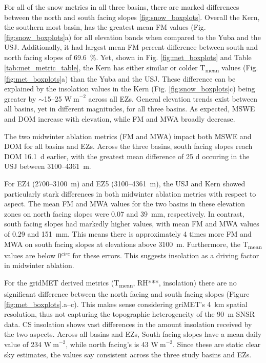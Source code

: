For all of the snow metrics in all three basins, there are marked differences between the north and south facing slopes \ref{fig:snow_boxplots}. Overall the Kern, the southern most basin, has the greatest mean FM values (Fig. \ref{fig:snow_boxplots}a) for all elevation bands when compared to the Yuba and the USJ. Additionally, it had largest mean FM percent difference between south and north facing slopes of 69.6~\%. Yet, shown in Fig. \ref{fig:met_boxplots} and Table \ref{tab:met_metric_table}, the Kern has either similar or colder T\textsubscript{mean} values (Fig. \ref{fig:met_boxplots}a) than the Yuba and the USJ. These difference can be explained by the insolation values in the Kern (Fig. \ref{fig:snow_boxplots}c) being greater by $\sim$15--25 $\mathrm{W~m}^{-2}$ across all EZs. General elevation trends exist between all basins, yet in different magnitudes, for all three basins. As expected, MSWE and DOM increase with elevation, while FM and MWA broadly decrease.

The two midwinter ablation metrics (FM and MWA) impact both MSWE and DOM for all basins and EZs. Across the three basins, south facing slopes reach DOM 16.1~d earlier, with the greatest mean difference of 25 d occuring in the USJ between 3100--4361~m.

For EZ4 (2700--3100~m) and EZ5 (3100--4361~m), the USJ and Kern showed particularly stark differences in both midwinter ablation metrics with respect to aspect. The mean FM and MWA values for the two basins in these elevation zones on north facing slopes were 0.07 and 39~mm, respectively. In contrast, south facing slopes had markedly higher values, with mean FM and MWA values of 0.29 and 151~mm. This means there is approximately 4 times more FM and MWA on south facing slopes at elevations above 3100~m. Furthermore, the T\textsubscript{mean} values are below 0$^{circ}$ for these errors. This suggests insolation as a driving factor in midwinter ablation.


For the gridMET derived metrics (T\textsubscript{mean}, RH***, insolation) there are no significant difference between the north facing and south facing slopes (Figure \ref{fig:met_boxplots}.a--c). This makes sense considering griMET's 4~km spatial resolution, thus not capturing the topographic heterogeneity of the 90~m SNSR data. CS insolation shows vast differences in the amount insolation received by the two aspects. Across all basins and EZs, South facing slopes have a mean daily value of 234 $\mathrm{W~m}^{-2}$, while north facing's is 43 $\mathrm{W~m}^{-2}$. Since these are static clear sky estimates, the values say consistent across the three study basins and EZs.


